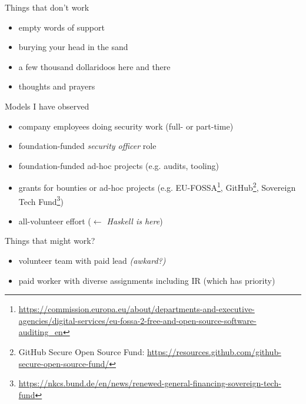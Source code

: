 \documentclass[ignorenonframetext,aspectratio=169,12pt]{beamer}
\begin{document}
\begin{frame}{Things that don't work}
  \begin{itemize}
    \item empty words of support
    \item burying your head in the sand
    \item a few thousand dollaridoos here and there
    \item thoughts and prayers
  \end{itemize}
\end{frame}

\begin{frame}{Models I have observed}
  \begin{itemize}
    \item company employees doing security work (full- or part-time)
    \item foundation-funded {\em security officer} role
    \item foundation-funded ad-hoc projects (e.g. audits, tooling)
    \item grants for bounties or ad-hoc projects (e.g.
      EU-FOSSA\footnote{\url{https://commission.europa.eu/about/departments-and-executive-agencies/digital-services/eu-fossa-2-free-and-open-source-software-auditing_en}},
      GitHub\footnote{GitHub Secure Open Source Fund:
      \url{https://resources.github.com/github-secure-open-source-fund/}},
      Sovereign Tech
      Fund\footnote{\url{https://nkcs.bund.de/en/news/renewed-general-financing-sovereign-tech-fund}})
    \item all-volunteer effort ({\em $\gets$ Haskell is here})
  \end{itemize}
\end{frame}

\begin{frame}{Things that might work?}
  \begin{itemize}
    \item volunteer team with paid lead {\em (awkard?)}
    \item paid worker with diverse assignments including IR (which has
      priority)
  \end{itemize}
\end{frame}
\end{document}
